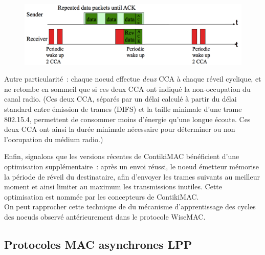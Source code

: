 \begin{figure}[!hbt]
\centering
\includegraphics[width=12.5cm]{images/ch3-contikimac.png}
\label{FigContikiMAC}
\end{figure}

Autre particularité~: chaque noeud effectue \emph{deux} CCA à chaque réveil
cyclique, et ne retombe en sommeil que si ces deux CCA ont indiqué
la non-occupation du canal radio. (Ces deux CCA, séparés par un délai
calculé à partir du délai standard entre émission de trames (DIFS)
et la taille minimale d'une trame 802.15.4, permettent de consommer
moins d'énergie qu'une longue écoute. Ces deux CCA ont ainsi la durée
minimale nécessaire pour déterminer ou non l'occupation du médium radio.)

Enfin, signalons que les versions récentes de ContikiMAC bénéficient d'une
optimisation supplémentaire~: après un envoi réussi, le noeud émetteur
mémorise la période de réveil du destinataire, afin d'envoyer les
trames suivants au meilleur moment et ainsi limiter au maximum
les transmissions inutiles. Cette optimisation est nommée  par les concepteurs de ContikiMAC. \\
On peut rapprocher cette technique de  du mécanisme
d'apprentissage des cycles des noeuds observé antérieurement dans le
protocole WiseMAC.


\subsection{Protocoles MAC asynchrones LPP}
\label{SubsecProtoMACLPP}

